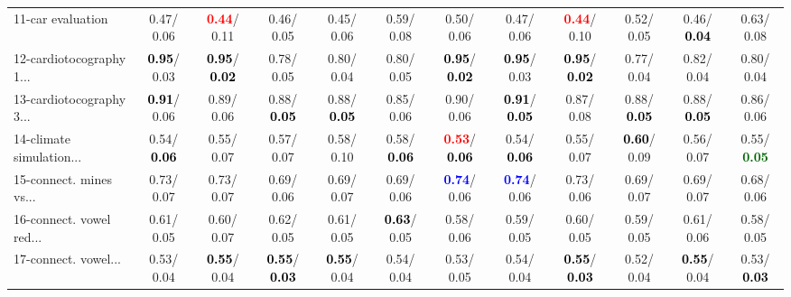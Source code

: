 \begin{table}[h]
\begin{center}
{\begin{tabular}{lc|c|c|c|c|c|c|c|c|c|c}
11-car evaluation &   0.47/  0.06 & \textcolor{red}{\textbf{  0.44}}/  0.11 &   0.46/  0.05 &   0.45/  0.06 &   0.59/  0.08 &   0.50/  0.06 &   0.47/  0.06 & \textcolor{red}{\textbf{  0.44}}/  0.10 &   0.52/  0.05 &   0.46/\textcolor{black}{\textbf{  0.04}} &   0.63/  0.08 \\
12-cardiotocography 1... & \textcolor{black}{\textbf{  0.95}}/  0.03 & \textcolor{black}{\textbf{  0.95}}/\textcolor{black}{\textbf{  0.02}} &   0.78/  0.05 &   0.80/  0.04 &   0.80/  0.05 & \textcolor{black}{\textbf{  0.95}}/\textcolor{black}{\textbf{  0.02}} & \textcolor{black}{\textbf{  0.95}}/  0.03 & \textcolor{black}{\textbf{  0.95}}/\textcolor{black}{\textbf{  0.02}} &   0.77/  0.04 &   0.82/  0.04 &   0.80/  0.04 \\
13-cardiotocography 3... & \textcolor{black}{\textbf{  0.91}}/  0.06 &   0.89/  0.06 &   0.88/\textcolor{black}{\textbf{  0.05}} &   0.88/\textcolor{black}{\textbf{  0.05}} &   0.85/  0.06 &   0.90/  0.06 & \textcolor{black}{\textbf{  0.91}}/\textcolor{black}{\textbf{  0.05}} &   0.87/  0.08 &   0.88/\textcolor{black}{\textbf{  0.05}} &   0.88/\textcolor{black}{\textbf{  0.05}} &   0.86/  0.06 \\
14-climate simulation... &   0.54/\textcolor{black}{\textbf{  0.06}} &   0.55/  0.07 &   0.57/  0.07 &   0.58/  0.10 &   0.58/\textcolor{black}{\textbf{  0.06}} & \textcolor{red}{\textbf{  0.53}}/\textcolor{black}{\textbf{  0.06}} &   0.54/\textcolor{black}{\textbf{  0.06}} &   0.55/  0.07 & \textcolor{black}{\textbf{  0.60}}/  0.09 &   0.56/  0.07 &   0.55/\textcolor{darkgreen}{\textbf{  0.05}} \\ \hline
15-connect. mines vs... &   0.73/  0.07 &   0.73/  0.07 &   0.69/  0.06 &   0.69/  0.07 &   0.69/  0.06 & \textcolor{blue}{\textbf{  0.74}}/  0.06 & \textcolor{blue}{\textbf{  0.74}}/  0.06 &   0.73/  0.06 &   0.69/  0.07 &   0.69/  0.07 &   0.68/  0.06 \\
16-connect. vowel red... &   0.61/  0.05 &   0.60/  0.07 &   0.62/  0.05 &   0.61/  0.05 & \textcolor{black}{\textbf{  0.63}}/  0.05 &   0.58/  0.06 &   0.59/  0.05 &   0.60/  0.05 &   0.59/  0.05 &   0.61/  0.06 &   0.58/  0.05 \\
17-connect. vowel... &   0.53/  0.04 & \textcolor{black}{\textbf{  0.55}}/  0.04 & \textcolor{black}{\textbf{  0.55}}/\textcolor{black}{\textbf{  0.03}} & \textcolor{black}{\textbf{  0.55}}/  0.04 &   0.54/  0.04 &   0.53/  0.05 &   0.54/  0.04 & \textcolor{black}{\textbf{  0.55}}/\textcolor{black}{\textbf{  0.03}} &   0.52/  0.04 & \textcolor{black}{\textbf{  0.55}}/  0.04 &   0.53/\textcolor{black}{\textbf{  0.03}} \\

\end{tabular}}
\end{center}
\end{table}
